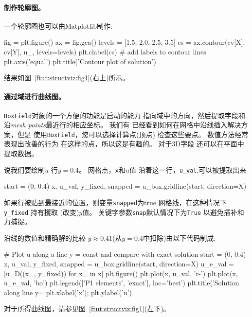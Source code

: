 

\paragraph{制作轮廓图。}
一个轮廓图也可以由Matplotlib制作:

\begin{python}
fig = plt.figure()
ax = fig.gca()
levels = [1.5, 2.0, 2.5, 3.5]
cs = ax.contour(cv[X], cv[Y], u_, levels=levels)
plt.clabel(cs)  # add labels to contour lines
plt.axis('equal')
plt.title('Contour plot of solution')
\end{python}
结果如图~\ref{ftut:structviz:fig1}(右上)所示。

\paragraph{通过域进行曲线图。}
\texttt{BoxField}对象的一个方便的功能是启动的能力
指向域中的方向，然后提取字段和
沿\emph{mesh points}最近行的相应坐标。 我们有
已经看到如何在网格中沿线插入解决方案，但是
使用\texttt{BoxField}，您可以选择计算点(顶点)
检查这些要点。 数值方法经常表现出改善的行为
在这样的点，所以这是有趣的。 对于3D字段
还可以在平面中提取数据。

说我们要绘制$u$
行$y=0.4$。 网格点，\texttt{x}和$ u $值
沿着这一行，\verb!u_val!,可以被提取出来


\begin{python}
start = (0, 0.4)
x, u_val, y_fixed, snapped = u_box.gridline(start, direction=X)
\end{python}
如果行被贴到最接近的位置，则变量\texttt{snapped}为true
网格线，在这种情况下\verb!y_fixed! 持有攫取
(改变)$y$值。 关键字参数\texttt{snap}默认情况下为\texttt{True}
以避免插补和力捕捉。

沿线的数值和精确解的比较
$y\approx 0.41$(从$y=0.4$中扣除)由以下代码制成:

\begin{python}
    # Plot u along a line y = const and compare with exact solution
    start = (0, 0.4)
    x, u_val, y_fixed, snapped = u_box.gridline(start, direction=X)
    u_e_val = [u_D((x_, y_fixed)) for x_ in x]
    plt.figure()
    plt.plot(x, u_val, 'r-')
    plt.plot(x, u_e_val, 'bo')
    plt.legend(['P1 elements', 'exact'], loc='best')
    plt.title('Solution along line y=%
    plt.xlabel('x');  plt.ylabel('u')
\end{python}
对于所得曲线图，请参见图~\ref{ftut:structviz:fig1}(左下)。
